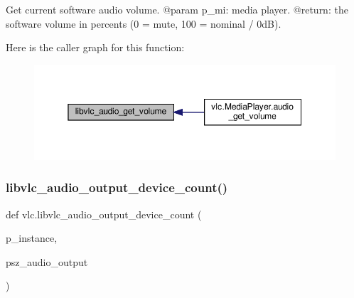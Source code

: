 \begin{DoxyVerb}Get current software audio volume.
@param p_mi: media player.
@return: the software volume in percents (0 = mute, 100 = nominal / 0dB).
\end{DoxyVerb}
 Here is the caller graph for this function\+:
\nopagebreak
\begin{figure}[H]
\begin{center}
\leavevmode
\includegraphics[width=350pt]{namespacevlc_a5bd4ab471d93bb2285affbfb6b865010_icgraph}
\end{center}
\end{figure}
\mbox{\label{namespacevlc_ab26cd1fc475f71b8faa4e86f9c95ce21}} 
\subsubsection{\texorpdfstring{libvlc\+\_\+audio\+\_\+output\+\_\+device\+\_\+count()}{libvlc\_audio\_output\_device\_count()}}
{\footnotesize\ttfamily def vlc.\+libvlc\+\_\+audio\+\_\+output\+\_\+device\+\_\+count (\begin{DoxyParamCaption}\item[{}]{p\+\_\+instance,  }\item[{}]{psz\+\_\+audio\+\_\+output }\end{DoxyParamCaption})}

